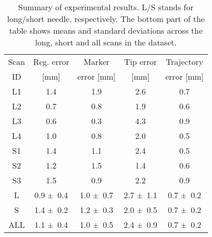 \begin{table}[t]
\begin{center}
\begin{tabular}{|c||c|c|c|c|}
\hline
Scan & Reg. error & Marker & Tip error & Trajectory\\
ID  & [mm] & error [mm] & [mm] & error  [mm]\\
\hline
\hline
L1 & 1.4 & 1.9 & 2.6 & 0.7\\
\hline
L2 & 0.7 & 0.8 & 1.9 & 0.6\\
\hline
L3 & 0.6 & 0.3 & 4.3 & 0.9 \\
\hline
L4 & 1.0 & 0.8 & 2.0 & 0.5\\
\hline
S1 & 1.4 & 1.1 & 2.4 & 0.5\\
\hline
S2 & 1.2 & 1.5 & 1.4 & 0.6\\
\hline
S3 & 1.5 & 0.9 & 2.2 & 0.9\\
\hline
\hline
L & 
0.9 $\pm\hspace{0.04cm}$ 0.4 & 
1.0 $\pm\hspace{0.04cm}$ 0.7 & 
2.7 $\pm\hspace{0.04cm}$ 1.1 & 
0.7 $\pm\hspace{0.04cm}$ 0.2\\
\hline
S & 
1.4 $\pm\hspace{0.04cm}$ 0.2 &  
1.2 $\pm\hspace{0.04cm}$ 0.3 & 
2.0 $\pm\hspace{0.04cm}$ 0.5 &  
0.7 $\pm\hspace{0.04cm}$ 0.2\\
\hline
ALL & 
1.1 $\pm\hspace{0.04cm}$ 0.4 &  
1.0 $\pm\hspace{0.04cm}$ 0.5 &  
2.4 $\pm\hspace{0.04cm}$ 0.9 &  
0.7 $\pm\hspace{0.04cm}$ 0.2\\
\hline
\end{tabular}
\caption{\small{Summary of experimental results. L/S stands for long/short needle, respectively.
The bottom part of the table shows means and standard deviations across the long, short and all scans in the dataset.}}
\label{results_table}
\end{center}
\end{table}
